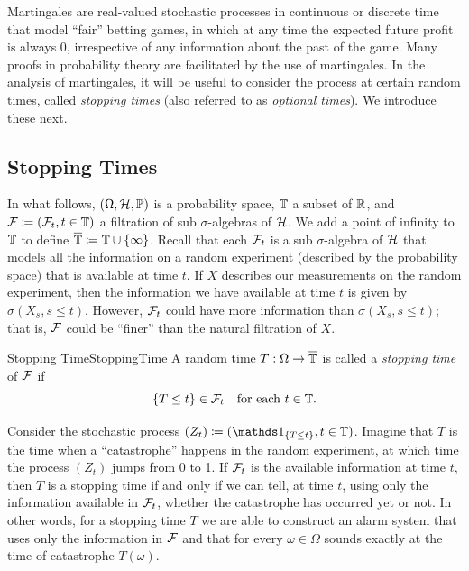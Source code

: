 Martingales are real-valued stochastic processes in continuous or discrete time that model ``fair'' betting games, in which at any time the expected future profit is always 0, irrespective of any information about the past of the game. Many proofs in probability theory are facilitated by the use of martingales. In the analysis of martingales, it will be useful to consider the process at certain random times, called \textit{stopping times} (also referred to as \textit{optional times}). We introduce these next.

\subsection{Stopping Times}
In what follows, \((\Omega, \mathcal{H}, \mathbb{P})\) is a probability space, \(\mathbb{T}\) a subset of \(\mathbb{R}\), and \(\mathcal{F} \coloneqq (\mathcal{F}_t, t \in \mathbb{T})\) a filtration of sub \(\sigma\)-algebras of \(\mathcal{H}\). We add a point of infinity to \(\mathbb{T}\) to define \(\overline{\mathbb{T}} \coloneqq \mathbb{T} \cup \{\infty\}\). Recall that each \(\mathcal{F}_t\) is a sub \(\sigma\)-algebra of \(\mathcal{H}\) that models all the information on a random experiment (described by the probability space) that is available at time \(t\). If \(X\) describes our measurements on the random experiment, then the information we have available at time \(t\) is given by \(\sigma(X_s, s \leq t)\). However, \(\mathcal{F}_t\) could have more information than \(\sigma(X_s, s \leq t)\); that is, \(\mathcal{F}\) could be ``finer'' than the natural filtration of \(X\).

\begin{defn}{Stopping Time}{StoppingTime}
	A random time \(T : \Omega \to \overline{\mathbb{T}}\) is called a \emph{stopping time} of \(\mathcal{F}\) if
	\begin{equation*}
		\{T \le t\} \in \mathcal{F}_t \quad \text{for each } t \in \mathbb{T}.
	\end{equation*}
\end{defn}

Consider the stochastic process \((Z_t) \idef (\I_{\set{T \leq t}}, t \in \bb{T})\). Imagine that \(T\) is the time when a ``catastrophe'' happens in the random experiment, at which time the process \((Z_t)\) jumps from 0 to 1. If \(\mathcal{F}_t\) is the available information at time \(t\), then \(T\) is a stopping time if and only if we can tell, at time \(t\), using only the information available in \(\mathcal{F}_t\), whether the catastrophe has occurred yet or not. In other words, for a stopping time \(T\) we are able to construct an alarm system that uses only the information in \(\mathcal{F}\) and that for every \(\omega \in \Omega\) sounds exactly at the time of catastrophe \(T(\omega)\).

